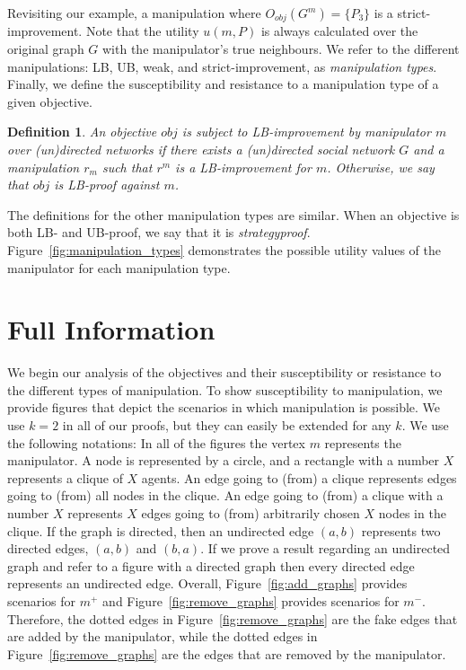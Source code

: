 \documentclass{article}
\newtheorem{definition}{Definition}
\begin{document}
Revisiting our example, a manipulation where $O_{obj}(G^m) = \{P_3\}$ is a strict-improvement. Note that the utility $u(m,P)$ is always calculated over the original graph $G$ with the manipulator's true neighbours.
We refer to the different manipulations: LB, UB, weak, and  strict-improvement, as \emph{manipulation types}.
Finally, we define the susceptibility and resistance to a manipulation type of a given objective.
\begin{definition}
\label{defn:subject_to_improvement}
An objective $obj$ is \emph{subject to LB-improvement} by manipulator $m$ over (un)directed networks
if there exists a (un)directed social network $G$ and a manipulation $r_m$ such that $r^m$ is a LB-improvement for $m$.
Otherwise, we say that $obj$ is \emph{LB-proof} against $m$.
\end{definition}
The definitions for the other manipulation types are similar.
When an objective is both LB- and UB-proof, we say that it is \emph{strategyproof}. Figure~\ref{fig:manipulation_types} demonstrates the possible utility values of the manipulator for each manipulation type. 



\section{Full Information}
\label{sec:full_info}
We begin our analysis of the objectives and their susceptibility or resistance to the different types of manipulation. %
To show susceptibility to manipulation, we provide figures that depict the scenarios in which manipulation is possible. We use $k=2$ in all of our proofs, but they can easily be extended for any $k$. We use the following notations: In all of the figures the vertex $m$ represents the manipulator. A node is represented by a circle, and a rectangle with a number $X$ represents a clique of $X$ agents. An edge going to (from) a clique represents edges going to (from) all nodes in the clique. An edge going to (from) a clique with a number $X$ represents $X$ edges going to (from) arbitrarily chosen $X$ nodes in the clique. 
If the graph is directed, then an undirected edge $(a,b)$ represents two directed edges, $(a,b)$ and $(b,a)$. If we prove a result regarding an undirected graph and refer to a figure with a directed graph then every directed edge represents an undirected edge. 
Overall, Figure~\ref{fig:add_graphs} provides scenarios for $m^+$ and Figure~\ref{fig:remove_graphs} provides scenarios for $m^-$. Therefore, the dotted edges in Figure~\ref{fig:remove_graphs} are the fake edges that are added by the manipulator, while the dotted edges in Figure~\ref{fig:remove_graphs} are the edges that are removed by the manipulator.
\end{document}
